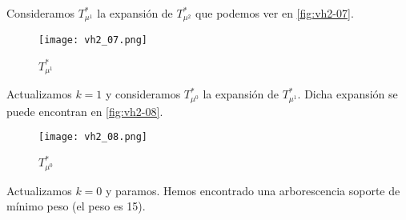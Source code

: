 \documentclass[12pt, oneside, a4paper]{article}
\begin{document}
Consideramos $T^{*}_{\mu^{1}}$ la expansión de $T^{*}_{\mu^{2}}$ que
podemos ver en \autoref{fig:vh2-07}.

\begin{figure}
\centering
\texttt{[image: vh2\_07.png]}
\caption{$T^{*}_{\mu^1}$}
\label{fig:vh2-07}
\end{figure}

Actualizamos $k=1$ y consideramos $T^{*}_{\mu^{0}}$ la expansión de
$T^{*}_{\mu^{1}}$. Dicha expansión se puede encontran en
\autoref{fig:vh2-08}.

\begin{figure}
\centering
\texttt{[image: vh2\_08.png]}
\caption{$T^{*}_{\mu^0}$}
\label{fig:vh2-08}
\end{figure}

Actualizamos $k=0$ y paramos. Hemos encontrado una arborescencia
soporte de mínimo peso (el peso es 15).
\end{document}
